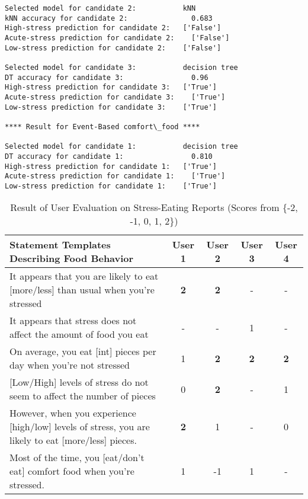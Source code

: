 \begin{lstlisting}[label={model-selection},caption={Result of model selection and prediction for each task},captionpos=b]
Selected model for candidate 2:           kNN
kNN accuracy for candidate 2:	            0.683
High-stress prediction for candidate 2:	  ['False']
Acute-stress prediction for candidate 2:	['False']
Low-stress prediction for candidate 2:	  ['False']

Selected model for candidate 3:           decision tree
DT accuracy for candidate 3:	            0.96
High-stress prediction for candidate 3:	  ['True']
Acute-stress prediction for candidate 3:	['True']
Low-stress prediction for candidate 3:	  ['True']

**** Result for Event-Based comfort\_food ****

Selected model for candidate 1:           decision tree
DT accuracy for candidate 1:	            0.810
High-stress prediction for candidate 1:	  ['True']
Acute-stress prediction for candidate 1:	['True']
Low-stress prediction for candidate 1:	  ['True']
\end{lstlisting}

\renewcommand{\arraystretch}{2}
\begin{table}[htpb]
  \caption[Result of User Evaluation]{Result of User Evaluation on Stress-Eating Reports (Scores from \{-2, -1, 0, 1, 2\})}\label{tab:evaluation}
  \centering
  \scriptsize
  \begin{tabular}{| m{30em} | c | c | c | c |}
    \toprule
      Statement Templates Describing Food Behavior & User 1 & User 2 & User 3 & User 4 \\
    \midrule
      It appears that you are likely to eat [more/less] than usual when you're stressed & \textbf{2} & \textbf{2} & - & - \\
      It appears that stress does not affect the amount of food you eat & - & - & 1 & - \\
      On average, you eat [int] pieces per day when you're not stressed & 1 & \textbf{2} & \textbf{2} & \textbf{2} \\
      {[Low/High]} levels of stress do not seem to affect the number of pieces & 0 & \textbf{2} & - & 1 \\
      However, when you experience [high/low] levels of stress, you are likely to eat [more/less] pieces. & \textbf{2} & 1 & - & 0 \\
      Most of the time, you [eat/don't eat] comfort food when you're stressed. & 1 & -1 & 1 & - \\
    \bottomrule
  \end{tabular}
\end{table}

